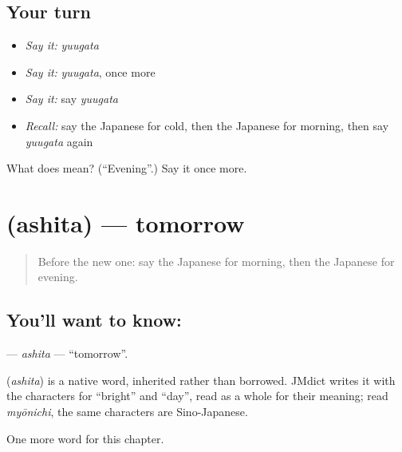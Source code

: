 \subsection*{Your turn}
\begin{itemize}
\raggedright
  \item \emph{Say it:} \emph{yuugata}
  \item \emph{Say it:} \emph{yuugata}, once more
  \item \emph{Say it:} say \emph{yuugata}
  \item \emph{Recall:} say the Japanese for cold, then the Japanese for morning, then say \emph{yuugata} again
\end{itemize}

\begin{tcolorbox}[breakable,colback=teal!4,colframe=teal!35!black,title={Before you move on}]
What does  mean? (\textquotedblleft{}Evening\textquotedblright{}.) Say it once more.
\end{tcolorbox}
\section[\texorpdfstring{\ja{あした} (ashita)}{あした (ashita)}]{ (ashita) — tomorrow}

\label{lesson:JA-C54-ashita}



\begin{quote}
Before the new one: say the Japanese for morning, then the Japanese for evening.
\end{quote}

\subsection*{You'll want to know: }
\textbf{} — \emph{ashita} — \textquotedblleft{}tomorrow\textquotedblright{}.

\begin{cousinweb}
\textbf{} (\emph{ashita}) is a native word, inherited rather than borrowed. JMdict writes it with the characters for \textquotedblleft{}bright\textquotedblright{} and \textquotedblleft{}day\textquotedblright{}, read as a whole for their meaning; read \emph{myōnichi}, the same characters are Sino-Japanese.
\end{cousinweb}

\begin{grammarlens}[title={What you've built}]
One more word for this chapter.
\end{grammarlens}

